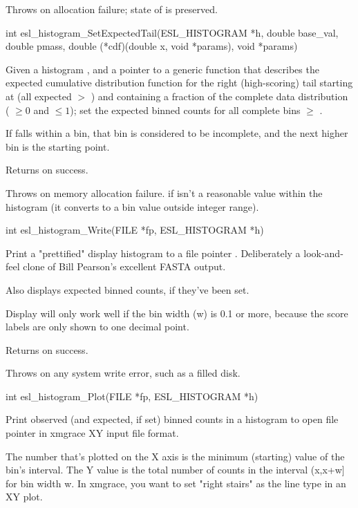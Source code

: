 \begin{sreapi}
Throws  on allocation failure; state of  is preserved.


\hypertarget{func:esl_histogram_SetExpectedTail()}
{\item[int esl\_histogram\_SetExpectedTail(ESL\_HISTOGRAM *h, double base\_val, double pmass,
			      double (*cdf)(double x, void *params), 
			      void *params)]}

Given a histogram , and a pointer to a generic function
 that describes the expected cumulative
distribution function for the right (high-scoring) tail
starting at  (all expected  $>$ ) and
containing a fraction  of the complete data
distribution ( $\geq 0$ and $\leq 1$);
set the expected binned counts for all complete bins
$\geq$ . 

If  falls within a bin, that bin is considered
to be incomplete, and the next higher bin is the starting
point. 

Returns  on success.

Throws  on memory allocation failure.
 if  isn't a reasonable value within
the histogram (it converts to a bin value outside
integer range).


\hypertarget{func:esl_histogram_Write()}
{\item[int esl\_histogram\_Write(FILE *fp, ESL\_HISTOGRAM *h)]}

Print a "prettified" display histogram  to a file
pointer .  Deliberately a look-and-feel clone of
Bill Pearson's excellent FASTA output.

Also displays expected binned counts, if they've been
set.

Display will only work well if the bin width (w) is 0.1
or more, because the score labels are only shown to one
decimal point.

Returns  on success.

Throws  on any system write error, such as a
filled disk.


\hypertarget{func:esl_histogram_Plot()}
{\item[int esl\_histogram\_Plot(FILE *fp, ESL\_HISTOGRAM *h)]}

Print observed (and expected, if set) binned counts
in a histogram  to open file pointer 
in xmgrace XY input file format.

The number that's plotted on the X axis is the minimum
(starting) value of the bin's interval. The Y value is
the total number of counts in the interval (x,x+w] for bin
width w. In xmgrace, you want to set "right stairs" as
the line type in an XY plot.


\end{sreapi}
